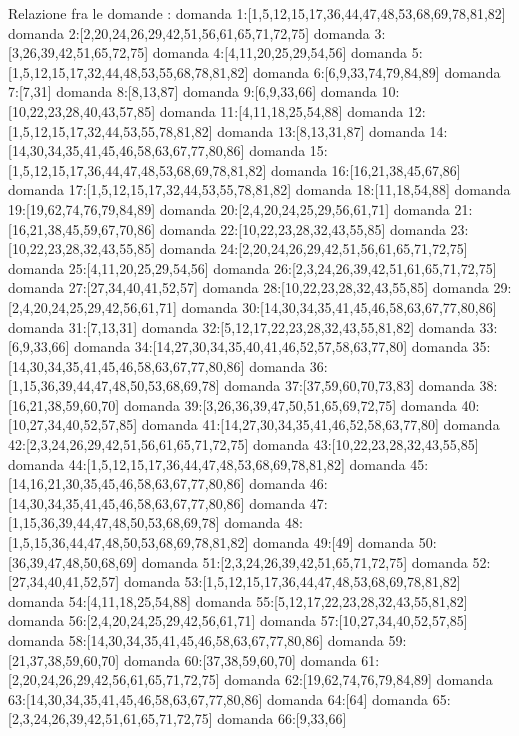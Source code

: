 Relazione fra le domande :
domanda 1:[1,5,12,15,17,36,44,47,48,53,68,69,78,81,82]
domanda 2:[2,20,24,26,29,42,51,56,61,65,71,72,75]
domanda 3:[3,26,39,42,51,65,72,75]
domanda 4:[4,11,20,25,29,54,56]
domanda 5:[1,5,12,15,17,32,44,48,53,55,68,78,81,82]
domanda 6:[6,9,33,74,79,84,89]
domanda 7:[7,31]
domanda 8:[8,13,87]
domanda 9:[6,9,33,66]
domanda 10:[10,22,23,28,40,43,57,85]
domanda 11:[4,11,18,25,54,88]
domanda 12:[1,5,12,15,17,32,44,53,55,78,81,82]
domanda 13:[8,13,31,87]
domanda 14:[14,30,34,35,41,45,46,58,63,67,77,80,86]
domanda 15:[1,5,12,15,17,36,44,47,48,53,68,69,78,81,82]
domanda 16:[16,21,38,45,67,86]
domanda 17:[1,5,12,15,17,32,44,53,55,78,81,82]
domanda 18:[11,18,54,88]
domanda 19:[19,62,74,76,79,84,89]
domanda 20:[2,4,20,24,25,29,56,61,71]
domanda 21:[16,21,38,45,59,67,70,86]
domanda 22:[10,22,23,28,32,43,55,85]
domanda 23:[10,22,23,28,32,43,55,85]
domanda 24:[2,20,24,26,29,42,51,56,61,65,71,72,75]
domanda 25:[4,11,20,25,29,54,56]
domanda 26:[2,3,24,26,39,42,51,61,65,71,72,75]
domanda 27:[27,34,40,41,52,57]
domanda 28:[10,22,23,28,32,43,55,85]
domanda 29:[2,4,20,24,25,29,42,56,61,71]
domanda 30:[14,30,34,35,41,45,46,58,63,67,77,80,86]
domanda 31:[7,13,31]
domanda 32:[5,12,17,22,23,28,32,43,55,81,82]
domanda 33:[6,9,33,66]
domanda 34:[14,27,30,34,35,40,41,46,52,57,58,63,77,80]
domanda 35:[14,30,34,35,41,45,46,58,63,67,77,80,86]
domanda 36:[1,15,36,39,44,47,48,50,53,68,69,78]
domanda 37:[37,59,60,70,73,83]
domanda 38:[16,21,38,59,60,70]
domanda 39:[3,26,36,39,47,50,51,65,69,72,75]
domanda 40:[10,27,34,40,52,57,85]
domanda 41:[14,27,30,34,35,41,46,52,58,63,77,80]
domanda 42:[2,3,24,26,29,42,51,56,61,65,71,72,75]
domanda 43:[10,22,23,28,32,43,55,85]
domanda 44:[1,5,12,15,17,36,44,47,48,53,68,69,78,81,82]
domanda 45:[14,16,21,30,35,45,46,58,63,67,77,80,86]
domanda 46:[14,30,34,35,41,45,46,58,63,67,77,80,86]
domanda 47:[1,15,36,39,44,47,48,50,53,68,69,78]
domanda 48:[1,5,15,36,44,47,48,50,53,68,69,78,81,82]
domanda 49:[49]
domanda 50:[36,39,47,48,50,68,69]
domanda 51:[2,3,24,26,39,42,51,65,71,72,75]
domanda 52:[27,34,40,41,52,57]
domanda 53:[1,5,12,15,17,36,44,47,48,53,68,69,78,81,82]
domanda 54:[4,11,18,25,54,88]
domanda 55:[5,12,17,22,23,28,32,43,55,81,82]
domanda 56:[2,4,20,24,25,29,42,56,61,71]
domanda 57:[10,27,34,40,52,57,85]
domanda 58:[14,30,34,35,41,45,46,58,63,67,77,80,86]
domanda 59:[21,37,38,59,60,70]
domanda 60:[37,38,59,60,70]
domanda 61:[2,20,24,26,29,42,56,61,65,71,72,75]
domanda 62:[19,62,74,76,79,84,89]
domanda 63:[14,30,34,35,41,45,46,58,63,67,77,80,86]
domanda 64:[64]
domanda 65:[2,3,24,26,39,42,51,61,65,71,72,75]
domanda 66:[9,33,66]
